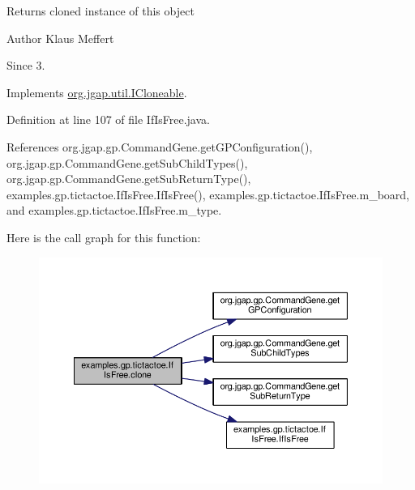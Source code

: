 \begin{DoxyReturn}{Returns}
cloned instance of this object
\end{DoxyReturn}
\begin{DoxyAuthor}{Author}
Klaus Meffert 
\end{DoxyAuthor}
\begin{DoxySince}{Since}
3. 
\end{DoxySince}


Implements \hyperlink{interfaceorg_1_1jgap_1_1util_1_1_i_cloneable_aa7e7d62077e6428ad7904932b1b4f7d5}{org.\-jgap.\-util.\-I\-Cloneable}.



Definition at line 107 of file If\-Is\-Free.\-java.



References org.\-jgap.\-gp.\-Command\-Gene.\-get\-G\-P\-Configuration(), org.\-jgap.\-gp.\-Command\-Gene.\-get\-Sub\-Child\-Types(), org.\-jgap.\-gp.\-Command\-Gene.\-get\-Sub\-Return\-Type(), examples.\-gp.\-tictactoe.\-If\-Is\-Free.\-If\-Is\-Free(), examples.\-gp.\-tictactoe.\-If\-Is\-Free.\-m\-\_\-board, and examples.\-gp.\-tictactoe.\-If\-Is\-Free.\-m\-\_\-type.



Here is the call graph for this function\-:
\nopagebreak
\begin{figure}[H]
\begin{center}
\leavevmode
\includegraphics[width=350pt]{classexamples_1_1gp_1_1tictactoe_1_1_if_is_free_a324fd630db9ca78c5b2c07b5bf1363cb_cgraph}
\end{center}
\end{figure}


